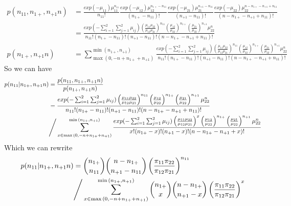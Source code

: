 \begin{align*}
	p(n_{11}, n_{1+}, n_{+1} n) &= \frac{exp(-\mu_{11})\mu_{11}^{n_{11}} }{n_{11}!} \frac{exp(-\mu_{12})\mu_{12}^{n_{1+} - n_{11}}}{(n_{1+} - n_{11})!} \frac{exp(-\mu_{21})\mu_{21}^{n_{+1} - n_{11}}}{(n_{+1} - n_{11})!} \frac{exp(-\mu_{22})\mu_{22}^{n- n_{1+} - n_{+1} + n_{11}}}{(n- n_{1+} - n_{+1} + n_{11})!}\\
	&= \frac{exp(-\sum_{i=1}^2 \sum_{j=1}^2 \mu_{ij}) \left( \frac{\mu_{11} \mu_{22}}{\mu_{12} \mu_{21}}\right) ^{n_{11}} \left(\frac{\mu_{12}}{\mu_{22}} \right)^{n_{1+}} \left(\frac{\mu_{21}}{\mu_{22}} \right)^{n_{+1}} \mu_{22}^{n}} {n_{11}! (n_{1+} - n_{11})! (n_{+1} - n_{11})! (n- n_{1+} - n_{+1} + n_{11})!}\\
	p(n_{1+}, n_{+1} n) &= \sum_{ \max{(0, -n + n_{1+} + n_{+1})}}^{\min{(n_{1+}, n_{+1})}} \frac{exp(-\sum_{i=1}^2 \sum_{j=1}^2 \mu_{ij}) \left( \frac{\mu_{11} \mu_{22}}{\mu_{12} \mu_{21}}\right) ^{n_{11}} \left(\frac{\mu_{12}}{\mu_{22}} \right)^{n_{1+}} \left(\frac{\mu_{21}}{\mu_{22}} \right)^{n_{+1}} \mu_{22}^{n}} {n_{11}! (n_{1+} - n_{11})! (n_{+1} - n_{11})! (n- n_{1+} - n_{+1} + n_{11})!}
\end{align*}
So we can have 
\begin{align*}
	p(n_{11}|n_{1+}, n_{+1} n) &= \frac{p(n_{11}, n_{1+}, n_{+1} n)}{p(n_{1+}, n_{+1} n)}\\
	 &= \frac{exp(-\sum_{i=1}^2 \sum_{j=1}^2 \mu_{ij}) \left( \frac{\mu_{11} \mu_{22}}{\mu_{12} \mu_{21}}\right) ^{n_{11}} \left(\frac{\mu_{12}}{\mu_{22}} \right)^{n_{1+}} \left(\frac{\mu_{21}}{\mu_{22}} \right)^{n_{+1}} \mu_{22}^{n}} {n_{11}! (n_{1+} - n_{11})! (n_{+1} - n_{11})! (n- n_{1+} - n_{+1} + n_{11})!} \\
	 & \Bigg{/} \sum_{x \in \max{(0, -n + n_{1+} + n_{+1})}}^{\min{(n_{1+}, n_{+1})}} \frac{exp(-\sum_{i=1}^2 \sum_{j=1}^2 \mu_{ij}) \left( \frac{\mu_{11} \mu_{22}}{\mu_{12} \mu_{21}}\right) ^{x} \left(\frac{\mu_{12}}{\mu_{22}} \right)^{n_{1+}} \left(\frac{\mu_{21}}{\mu_{22}} \right)^{n_{+1}} \mu_{22}^{n}} {x! (n_{1+} - x)! (n_{+1} - x)! (n- n_{1+} - n_{+1} + x)!}
\end{align*}	
Which we can rewrite 
\begin{align*}
	p(n_{11}|n_{1+}, n_{+1} n) &= {n_{1+} \choose n_{11}} {n - n_{1+} \choose n_{+1}-n_{11}} \left( \frac{\pi_{11} \pi_{22}}{\pi_{12} \pi_{21}} \right)^{n_{11}}\\
	& \Bigg{/}  \sum_{x \in \max{(0, -n + n_{1+} + n_{+1})}}^{\min{(n_{1+}, n_{+1})}} {n_{1+} \choose x} {n - n_{1+} \choose n_{+1}-x} \left( \frac{\pi_{11} \pi_{22}}{\pi_{12} \pi_{21}}\right) ^x
\end{align*}

